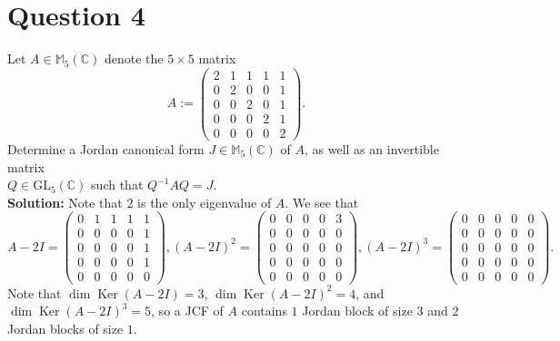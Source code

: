 \documentclass[12pt]{article}
\DeclareMathOperator{\Ker}{Ker}
\begin{document}
\section*{Question 4}
Let $A \in \mathbb{M}_5(\mathbb{C})$ denote the $5 \times 5$ matrix \[
A := \begin{pmatrix}
    2 & 1 & 1 & 1 & 1 \\
    0 & 2 & 0 & 0 & 1 \\
    0 & 0 & 2 & 0 & 1 \\
    0 & 0 & 0 & 2 & 1 \\
    0 & 0 & 0 & 0 & 2
\end{pmatrix}.
\]
Determine a Jordan canonical form $J \in \mathbb{M}_5(\mathbb{C})$ of $A$, as well as an invertible matrix \\
$Q \in \mathrm{GL}_5(\mathbb{C})$ such that $Q^{-1}AQ = J$. \\

\noindent \textbf{Solution:} Note that $2$ is the only eigenvalue of $A$. We see that \[A - 2I = \begin{pmatrix}
    0 & 1 & 1 & 1 & 1 \\
    0 & 0 & 0 & 0 & 1 \\
    0 & 0 & 0 & 0 & 1 \\
    0 & 0 & 0 & 0 & 1 \\
    0 & 0 & 0 & 0 & 0
\end{pmatrix}, (A - 2I)^2 = \begin{pmatrix}
    0 & 0 & 0 & 0 & 3 \\
    0 & 0 & 0 & 0 & 0 \\
    0 & 0 & 0 & 0 & 0 \\
    0 & 0 & 0 & 0 & 0 \\
    0 & 0 & 0 & 0 & 0
\end{pmatrix}, (A - 2I)^3 = \begin{pmatrix}
    0 & 0 & 0 & 0 & 0 \\
    0 & 0 & 0 & 0 & 0 \\
    0 & 0 & 0 & 0 & 0 \\
    0 & 0 & 0 & 0 & 0 \\
    0 & 0 & 0 & 0 & 0
\end{pmatrix}. 
\] Note that $\dim \Ker(A - 2I) = 3$, $\dim \Ker(A - 2I)^2 = 4$, and $\dim \Ker(A - 2I)^3 = 5$, so a JCF of $A$ contains $1$ Jordan block of size $3$ and $2$ Jordan blocks of size $1$.\\
\end{document}

